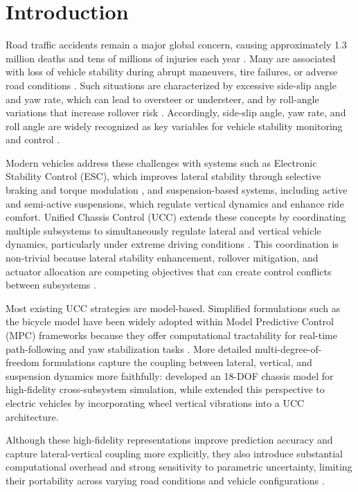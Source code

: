 \documentclass[sn-chicago,iicol]{sn-jnl}
\theoremstyle{thmstyleone}%
\theoremstyle{thmstyletwo}%
\theoremstyle{thmstylethree}%
\begin{document}
\section{Introduction}\label{intro}

Road traffic accidents remain a major global concern, causing approximately 1.3 million deaths 
and tens of millions of injuries each year \citep{UN2022}. Many are associated with loss of 
vehicle stability during abrupt maneuvers, tire failures, or adverse road conditions 
\citep{Friedman2010}. Such situations are characterized by excessive side-slip angle and yaw rate, 
which can lead to oversteer or understeer, and by roll-angle variations that increase rollover risk 
\citep{Stolle2011,zhan2017yawrate,nguyen2023rollover}. Accordingly, side-slip angle, yaw rate, and 
roll angle are widely recognized as key variables for vehicle stability monitoring and control 
\citep{Rajamani2012}.

Modern vehicles address these challenges with systems such as Electronic 
Stability Control (ESC), which improves lateral stability through selective braking and torque 
modulation \citep{Hac2007}, and suspension-based systems, including active and semi-active 
suspensions, which regulate vertical dynamics and enhance ride comfort. Unified Chassis Control 
(UCC) extends these concepts by coordinating multiple subsystems to simultaneously regulate lateral 
and vertical vehicle dynamics, particularly under extreme driving conditions \citep{Cho2012}. This 
coordination is non-trivial because lateral stability enhancement, rollover mitigation, and 
actuator allocation are competing objectives that can create control conflicts between subsystems 
\citep{Falcone2007}.

Most existing UCC strategies are model-based. Simplified formulations such as the bicycle model 
have been widely adopted within Model Predictive Control (MPC) frameworks because they offer 
computational tractability for real-time path-following and yaw stabilization tasks 
\citep{Ahmadi2021,Gidlewski2017,Yakub2016}. More detailed multi-degree-of-freedom formulations 
capture the coupling between lateral, vertical, and suspension dynamics more faithfully: 
\citet{Lai2021} developed an 18-DOF chassis model for high-fidelity cross-subsystem simulation, 
while \citet{Chen2021} extended this perspective to electric vehicles by incorporating wheel 
vertical vibrations into a UCC architecture.

Although these high-fidelity representations improve prediction accuracy and capture 
lateral-vertical coupling more explicitly, they also introduce substantial computational overhead 
and strong sensitivity to parametric uncertainty, limiting their portability across varying road 
conditions and vehicle configurations \citep{Guo2020A,Lew2024Risk-Averse}.
\end{document}
